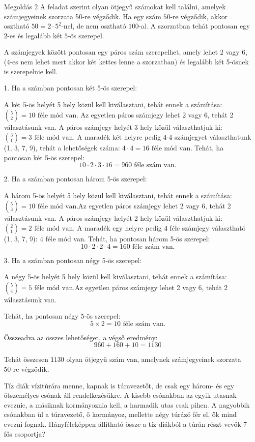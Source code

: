 \begin{solution}
Megoldás 2 A feladat szerint olyan ötjegyű számokat kell találni,
amelyek számjegyeinek szorzata 50-re végződik. Ha egy szám $50$-re
végződik, akkor osztható $50=2\cdot5^{2}$-nel, de nem osztható $100$-al.
A szorzatban tehát pontosan egy $2$-es és legalább két $5$-ös szerepel.

A számjegyek között pontosan egy páros szám szerepelhet, amely lehet
2 vagy 6,(4-es nem lehet mert akkor két kettes lenne a szorzatban)
és legalább két 5-ösnek is szerepelnie kell.

1. Ha a számban pontosan két 5-ös szerepel:

A két 5-ös helyét 5 hely közül kell kiválasztani, tehát ennek a számítása:
$\binom{5}{2}=10\text{ féle mód van.}$ Az egyetlen páros számjegy
lehet 2 vagy 6, tehát 2 választásunk van. A páros számjegy helyét
3 hely közül választhatjuk ki: $\binom{3}{1}=3\text{ féle mód van.}$
A maradék két helyre pedig 4-4 számjegyet választhatunk (1, 3, 7,
9), tehát a lehetőségek száma: $4\cdot4=16\text{ féle mód van.}$
Tehát, ha pontosan két 5-ös szerepel:
\[
10\cdot2\cdot3\cdot16=960\text{ féle szám van.}
\]

2. Ha a számban pontosan három 5-ös szerepel:

A három 5-ös helyét 5 hely közül kell kiválasztani, tehát ennek a
számítása: $\binom{5}{3}=10\text{ féle mód van.}$Az egyetlen páros
számjegy lehet 2 vagy 6, tehát 2 választásunk van. A páros számjegy
helyét 2 hely közül választhatjuk ki: $\binom{2}{1}=2\text{ féle mód van.}$
A maradék egy helyre pedig 4 féle számjegy választható (1, 3, 7, 9):
$4$ féle mód van. Tehát, ha pontosan három 5-ös szerepel:
\[
10\cdot2\cdot2\cdot4=160\text{ féle szám van.}
\]

3. Ha a számban pontosan négy 5-ös szerepel:

A négy 5-ös helyét 5 hely közül kell kiválasztani, tehát ennek a számítása:
$\binom{5}{4}=5\text{ féle mód van.}$Az egyetlen páros számjegy
lehet 2 vagy 6, tehát 2 választásunk van.

Tehát, ha pontosan négy 5-ös szerepel: 
\[
5\times2=10\text{ féle szám van.}
\]

Összeadva az összes lehetőséget, a végső eredmény:
\[
960+160+10=1130
\]

Tehát összesen $1130$ olyan ötjegyű szám van, amelynek számjegyeinek
szorzata 50-re végződik.
\end{solution}
\begin{extraproblem}
Tíz diák vízitúrára menne, kapnak is túravezetőt, de csak egy három-
és egy ötszemélyes csónak áll rendelkezésükre. A kisebb csónakban
az egyik utasnak eveznie, a másiknak kormányoznia kell, a harmadik
utas csak pihen. A nagyobbik csónakban ül a túravezető, ő kormányoz,
mellette négy túrázó fér el, ők mind evezni fognak. Hányféleképpen
állítható össze a tíz diákból a túrán részt vevők 7 fős csoportja?
\end{extraproblem}

